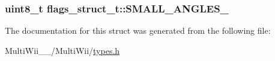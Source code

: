 \hypertarget{structflags__struct__t_a897b15ddbc69e00652f3444f7f1f4217}{
\subsubsection[{S\-M\-A\-L\-L\-\_\-\-A\-N\-G\-L\-E\-S\-\_\-25}]{\setlength{\rightskip}{0pt plus 5cm}uint8\-\_\-t flags\-\_\-struct\-\_\-t\-::\-S\-M\-A\-L\-L\-\_\-\-A\-N\-G\-L\-E\-S\-\_}}\label{structflags__struct__t_a897b15ddbc69e00652f3444f7f1f4217}


The documentation for this struct was generated from the following file\-:\begin{DoxyCompactItemize}
\item 
Multi\-Wii\-\_\-\_/\-Multi\-Wii/\hyperlink{MultiWii__2__4_2MultiWii_2types_8h}{types.\-h}\end{DoxyCompactItemize}
